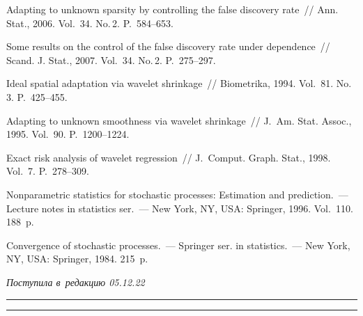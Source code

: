 \begin{multicols}{2}
{{\begin{thebibliography}{9}
Adapting to unknown sparsity by controlling the false discovery rate~//  
Ann. Stat., 2006. Vol.~34. No.\,2. P.~584--653.

Some results on the control of the false discovery rate under dependence~// 
Scand. J. Stat., 2007. Vol.~34. No.\,2. P.~275--297.

Ideal spatial adaptation via wavelet shrinkage~// Biometrika, 1994. Vol.~81. 
No.\,3. P.~425--455.

Adapting to unknown smoothness via wavelet shrinkage~// J.~Am. Stat. Assoc., 
1995. Vol.~90. P.~1200--1224.

Exact risk analysis of wavelet regression~// J.~Comput. Graph. Stat., 1998. 
Vol.~7. P.~278--309.

Nonparametric statistics for stochastic processes: Estimation and prediction.~--- 
Lecture notes in statistics ser.~--- New York, NY, USA: Springer, 1996. Vol.~110. 
188~p.

Convergence of stochastic processes.~--- Springer ser. in statistics.~--- New 
York, NY, USA: Springer, 1984. 215~p.
\end{thebibliography}

 }
 }

\end{multicols}

\vspace*{-6pt}

\hfill{\small\textit{Поступила в~редакцию 05.12.22}}

\vspace*{8pt}




\hrule

\vspace*{2pt}

\hrule


\def\tit{MEAN-SQUARE RISK OF~THE~FDR PROCEDURE\\ UNDER~WEAK DEPENDENCE}


